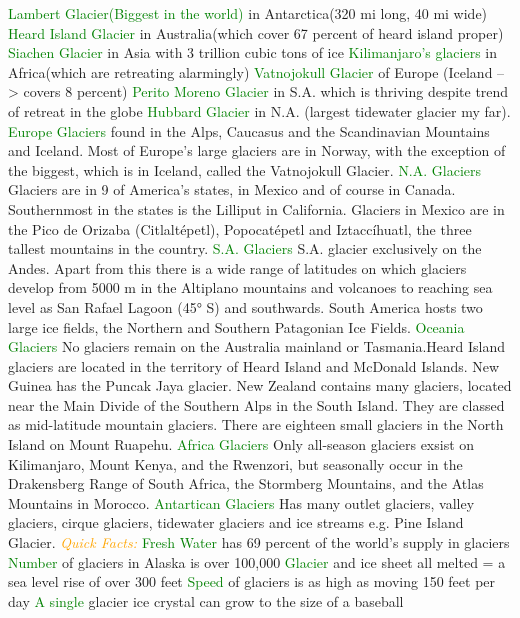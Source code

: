 \documentclass{article}
\newcommand{\green}[1]{\textcolor{green}{#1}}
\newcommand{\orange}[1]{\textcolor{orange}{#1}}
\newcommand{\mysub}[1]{{\textit{\orange{#1}}}}
\newcommand{\mysubsub}[1]{{{\green{#1}}}}
\begin{document}
\begin{multicols*}{4}
    	    \mysubsub {Lambert Glacier(Biggest in the world)} in Antarctica(320 mi long, 40 mi wide)
    	    \mysubsub {Heard Island Glacier} in Australia(which cover 67 percent of heard island proper)
    	    \mysubsub {Siachen Glacier} in Asia with 3 trillion cubic tons of ice
    	    \mysubsub {Kilimanjaro's glaciers} in Africa(which are retreating alarmingly)
    	    \mysubsub {Vatnojokull Glacier} of Europe (Iceland --> covers 8 percent)
    	    \mysubsub {Perito Moreno Glacier} in S.A. which is thriving despite trend of retreat in the globe
    	    \mysubsub {Hubbard Glacier} in N.A. (largest tidewater glacier my far). 
	    \mysubsub{Europe Glaciers} found in the Alps, Caucasus and the Scandinavian Mountains and Iceland. Most of Europe's large glaciers are in Norway, with the exception of the biggest, which is in Iceland, called the Vatnojokull Glacier.
	    \mysubsub{N.A. Glaciers} Glaciers are in 9 of America's states, in Mexico and of course in Canada. Southernmost in the states is the Lilliput in California. Glaciers in Mexico are in the Pico de Orizaba (Citlaltépetl), Popocatépetl and Iztaccíhuatl, the three tallest mountains in the country.
	    \mysubsub{S.A. Glaciers} S.A. glacier exclusively on the Andes. Apart from this there is a wide range of latitudes on which glaciers develop from 5000 m in the Altiplano mountains and volcanoes to reaching sea level as San Rafael Lagoon (45° S) and southwards. South America hosts two large ice fields, the Northern and Southern Patagonian Ice Fields.
	    \mysubsub{Oceania Glaciers} No glaciers remain on the Australia mainland or Tasmania.Heard Island glaciers are located in the territory of Heard Island and McDonald Islands. New Guinea has the Puncak Jaya glacier. New Zealand contains many glaciers,  located near the Main Divide of the Southern Alps in the South Island. They are classed as mid-latitude mountain glaciers. There are eighteen small glaciers in the North Island on Mount Ruapehu.
	    \mysubsub{Africa Glaciers} Only all-season glaciers exsist on Kilimanjaro, Mount Kenya, and the Rwenzori, but seasonally occur in the Drakensberg Range of South Africa, the Stormberg Mountains, and the Atlas Mountains in Morocco.
	    \mysubsub{Antartican Glaciers} Has many outlet glaciers, valley glaciers, cirque glaciers, tidewater glaciers and ice streams e.g. Pine Island Glacier. 
	    \mysub{Quick Facts: }
	    \mysubsub{Fresh Water} has 69 percent of the world's supply in glaciers
	    \mysubsub{Number} of glaciers in Alaska is over 100,000
	    \mysubsub{Glacier} and ice sheet all melted = a sea level rise of over 300 feet
	    \mysubsub{Speed} of glaciers is as high as moving 150 feet per day
	    \mysubsub{A single} glacier ice crystal can grow to the size of a baseball
	\end{multicols*}
\end{document}

